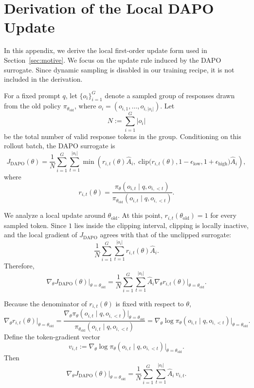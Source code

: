 \documentclass{article} %
\begin{document}
\section{Derivation of the Local DAPO Update}
\label{app:dapo-local-update}

In this appendix, we derive the local first-order update form used in
Section~\ref{sec:motive}. We focus on the update rule induced by the DAPO
surrogate. Since dynamic sampling is disabled in our training recipe, it is not
included in the derivation.

For a fixed prompt \(q\), let \(\{o_i\}_{i=1}^G\) denote a sampled group of
responses drawn from the old policy \(\pi_{\theta_{\mathrm{old}}}\), where
\(o_i=(o_{i,1},\dots,o_{i,|o_i|})\). Let
\[
N := \sum_{i=1}^G |o_i|
\]
be the total number of valid response tokens in the group. Conditioning on this
rollout batch, the DAPO surrogate is
\[
J_{\mathrm{DAPO}}(\theta)
=
\frac{1}{N}
\sum_{i=1}^G \sum_{t=1}^{|o_i|}
\min\!\left(
r_{i,t}(\theta)\hat A_i,\;
\mathrm{clip}\!\big(
r_{i,t}(\theta),
1-\epsilon_{\mathrm{low}},
1+\epsilon_{\mathrm{high}}
\big)\hat A_i
\right),
\]
where
\[
r_{i,t}(\theta)
=
\frac{
\pi_\theta(o_{i,t}\mid q,o_{i,<t})
}{
\pi_{\theta_{\mathrm{old}}}(o_{i,t}\mid q,o_{i,<t})
}.
\]

We analyze a local update around \(\theta_{\mathrm{old}}\). At this point,
\(r_{i,t}(\theta_{\mathrm{old}})=1\) for every sampled token. Since \(1\) lies
inside the clipping interval, clipping is locally inactive, and the local
gradient of \(J_{\mathrm{DAPO}}\) agrees with that of the unclipped surrogate:
\[
\frac{1}{N}
\sum_{i=1}^G \sum_{t=1}^{|o_i|}
r_{i,t}(\theta)\hat A_i.
\]
Therefore,
\[
\nabla_\theta J_{\mathrm{DAPO}}(\theta)\Big|_{\theta=\theta_{\mathrm{old}}}
=
\frac{1}{N}
\sum_{i=1}^G \sum_{t=1}^{|o_i|}
\hat A_i
\nabla_\theta r_{i,t}(\theta)\Big|_{\theta=\theta_{\mathrm{old}}}.
\]

Because the denominator of \(r_{i,t}(\theta)\) is fixed with respect to
\(\theta\),
\[
\nabla_\theta r_{i,t}(\theta)\Big|_{\theta=\theta_{\mathrm{old}}}
=
\frac{
\nabla_\theta \pi_\theta(o_{i,t}\mid q,o_{i,<t})
\big|_{\theta=\theta_{\mathrm{old}}}
}{
\pi_{\theta_{\mathrm{old}}}(o_{i,t}\mid q,o_{i,<t})
}
=
\nabla_\theta
\log \pi_\theta(o_{i,t}\mid q,o_{i,<t})
\Big|_{\theta=\theta_{\mathrm{old}}}.
\]
Define the token-gradient vector
\[
v_{i,t}
:=
\nabla_\theta
\log \pi_\theta(o_{i,t}\mid q,o_{i,<t})
\Big|_{\theta=\theta_{\mathrm{old}}}.
\]
Then
\[
\nabla_\theta J_{\mathrm{DAPO}}(\theta)\Big|_{\theta=\theta_{\mathrm{old}}}
=
\frac{1}{N}
\sum_{i=1}^G \sum_{t=1}^{|o_i|}
\hat A_i\,v_{i,t}.
\]
\end{document}
